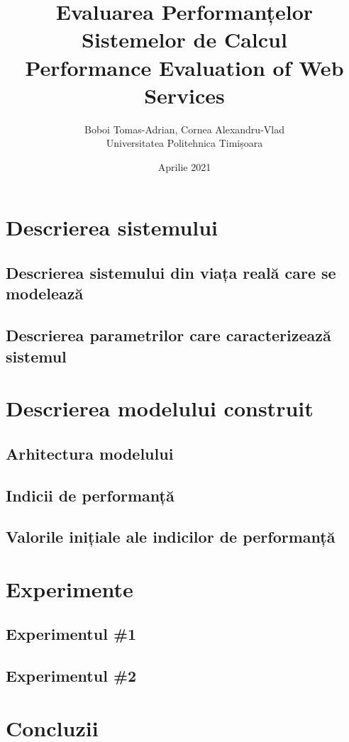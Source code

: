 \documentclass[12pt]{article}
\author{Boboi Tomas-Adrian, Cornea Alexandru-Vlad\\ Universitatea Politehnica Timișoara}
\date{Aprilie 2021}
\title{Evaluarea Performanțelor Sistemelor de Calcul\\ Performance Evaluation of Web Services}
\begin{document}
    \maketitle
    \thispagestyle{empty}
    \pagebreak

    \tableofcontents
    \pagebreak

    \section{Descrierea sistemului}

        \subsection{Descrierea sistemului din viața reală care se modelează}
            \lipsum[1-2]

        \subsection{Descrierea parametrilor care caracterizează sistemul}
            \lipsum[1-2]


    \section{Descrierea modelului construit}

        \subsection{Arhitectura modelului}
            \lipsum[1-2]

        \subsection{Indicii de performanță}
            \lipsum[1-2]

        \subsection{Valorile inițiale ale indicilor de performanță}
            \lipsum[1-2]


    \section{Experimente}

        \subsection{Experimentul \#1}
            \lipsum[1-2]
        
        \subsection{Experimentul \#2}
            \lipsum[1-2]

    \section{Concluzii}
        \lipsum[1-2]
\end{document}
